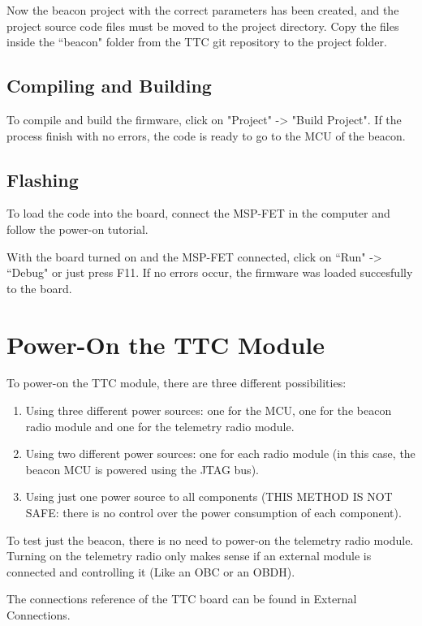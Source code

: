 \documentclass[12pt]{book}
\begin{document}
\begin{appendices}
Now the beacon project with the correct parameters has been created, and the project source code files must be moved to the project directory. Copy the files inside the ``beacon" folder from the TTC git repository to the project folder.

\section{Compiling and Building}

To compile and build the firmware, click on "Project" -> "Build Project". If the process finish with no errors, the code is ready to go to the MCU of the beacon.

\section{Flashing}

To load the code into the board, connect the MSP-FET in the computer and follow the power-on tutorial.

With the board turned on and the MSP-FET connected, click on ``Run" -> ``Debug" or just press F11. If no errors occur, the firmware was loaded succesfully to the board.

\chapter{Power-On the TTC Module}

To power-on the TTC module, there are three different possibilities:

\begin{enumerate}
    \item Using three different power sources: one for the MCU, one for the beacon radio module and one for the telemetry radio module.
    \item Using two different power sources: one for each radio module (in this case, the beacon MCU is powered using the JTAG bus).
    \item Using just one power source to all components (THIS METHOD IS NOT SAFE: there is no control over the power consumption of each component).
\end{enumerate}

To test just the beacon, there is no need to power-on the telemetry radio module. Turning on the telemetry radio only makes sense if an external module is connected and controlling it (Like an OBC or an OBDH).

The connections reference of the TTC board can be found in External Connections.


\end{appendices}
\end{document}
